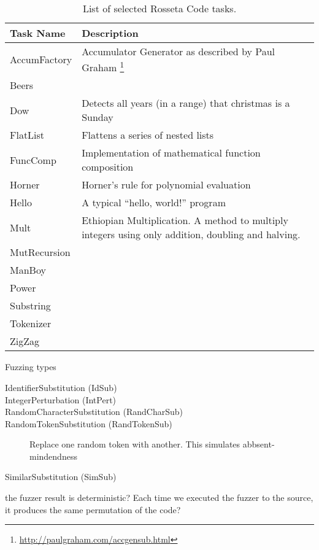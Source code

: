 \documentclass[10pt]{sigplanconf}
\begin{document}
\begin{table}
\begin{center}
\caption{List of selected Rosseta Code tasks.}
\label{tab:Tasks}
\begin{tabular}{ l p{5cm}}
 \hline
Task Name & Description\\
\hline
AccumFactory & Accumulator Generator as described by Paul Graham \footnote{\url{http://paulgraham.com/accgensub.html}}\\
Beers \\
Dow & Detects all years (in a range) that christmas is a Sunday\\
FlatList & Flattens a series of nested lists\\
FuncComp & Implementation of mathematical function composition\\
Horner & Horner's rule for polynomial evaluation\\
Hello & A typical ``hello, world!'' program\\
Mult & Ethiopian Multiplication. A method to multiply integers using only addition, doubling and halving.\\
MutRecursion \\
ManBoy \\
Power \\
Substring \\
Tokenizer \\
ZigZag \\
\hline
\end{tabular}
\end{center}
\end{table}

Fuzzing types

\begin{description}
	\item [IdentifierSubstitution (IdSub)]
	\item [IntegerPerturbation (IntPert)]
	\item [RandomCharacterSubstitution (RandCharSub)]
	\item [RandomTokenSubstitution (RandTokenSub)] Replace one random token with another. This simulates abbsent-mindendness

	\item [SimilarSubstitution (SimSub)]
\end{description}

the fuzzer result is deterministic? Each time we executed the fuzzer to the source, it produces the same permutation of the code?
\end{document}
